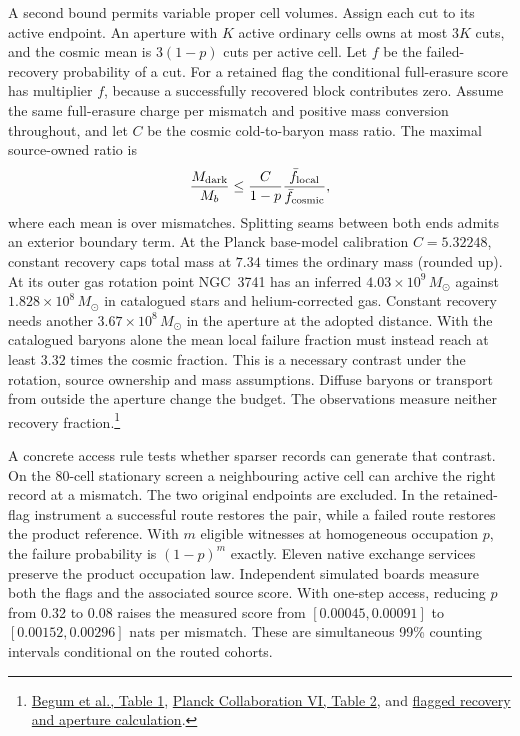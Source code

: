 \documentclass[11pt]{article}
\begin{document}
A second bound permits variable proper cell volumes. Assign each cut to its
active endpoint. An aperture with $K$ active ordinary cells owns at most
$3K$ cuts, and the cosmic mean is $3(1-p)$ cuts per active cell.
Let $f$ be the failed-recovery probability of a cut. For a retained flag
the conditional full-erasure score has multiplier $f$, because a
successfully recovered block contributes zero. Assume the same full-erasure
charge per mismatch and positive mass conversion throughout, and let $C$
be the cosmic cold-to-baryon mass ratio. The maximal source-owned ratio is
\[
 \frac{M_{\rm dark}}{M_b}\le
 \frac{C}{1-p}\frac{\bar f_{\rm local}}{\bar f_{\rm cosmic}},
\]
where each mean is over mismatches. Splitting seams between both ends
admits an exterior boundary term. At the Planck base-model calibration
$C=5.32248$, constant recovery caps total mass at $7.34$ times the
ordinary mass (rounded up). At its outer gas rotation point NGC~3741 has
an inferred $4.03\times10^9\,M_\odot$ against
$1.828\times10^8\,M_\odot$ in catalogued stars and helium-corrected gas.
Constant recovery needs another $3.67\times10^8\,M_\odot$ in the
aperture at the adopted distance. With the catalogued baryons alone the
mean local failure fraction must instead reach at least $3.32$ times
the cosmic fraction. This is a necessary contrast under the rotation,
source ownership and mass assumptions. Diffuse baryons or transport
from outside the aperture change the budget. The observations measure
neither recovery fraction.\footnote{\href{https://academic.oup.com/mnras/article/383/2/809/995293}{Begum et al., Table 1},
\href{https://arxiv.org/abs/1807.06209}{Planck Collaboration VI, Table 2}, and
\href{https://github.com/FloatingPragma/observer-patch-holography/tree/main/openwave/interval_echo/row_19/recovery_identity}{flagged recovery and aperture calculation}.}

A concrete access rule tests whether sparser records can generate that
contrast. On the 80-cell stationary screen a neighbouring active cell
can archive the right record at a mismatch. The two original endpoints
are excluded. In the retained-flag instrument a successful route restores
the pair, while a failed route restores the product reference. With $m$
eligible witnesses at homogeneous occupation $p$, the failure probability
is $(1-p)^m$ exactly. Eleven native exchange services preserve the product
occupation law. Independent simulated boards measure both the flags and
the associated source score. With one-step access, reducing $p$ from 0.32
to 0.08 raises the measured score from $[0.00045,0.00091]$ to
$[0.00152,0.00296]$ nats per mismatch. These are simultaneous 99\%
counting intervals conditional on the routed cohorts.
\end{document}
